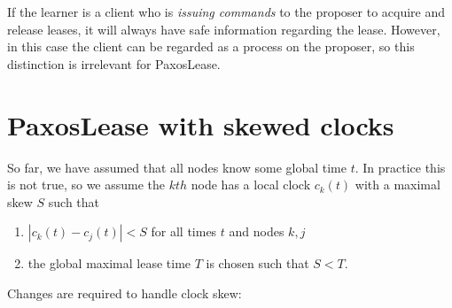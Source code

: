 \documentclass[12pt]{article}
\begin{document}
If the learner is a client who is \emph{issuing commands} to the proposer to acquire and release leases, it will always have safe information regarding the lease. However, in this case the client can be regarded as a process on the proposer, so this distinction is irrelevant for PaxosLease.

\section{ PaxosLease with skewed clocks }

So far, we have assumed that all nodes know some global time $t$. In practice this is not true, so we assume the $kth$ node has a local clock $c_k(t)$ with a maximal skew $S$ such that

\begin{enumerate}

\item $|c_k(t) - c_j(t)| < S$ for all times $t$ and nodes $k, j$

\item the global maximal lease time $T$ is chosen such that $S < T$.

\end{enumerate}

Changes are required to handle clock skew:
\end{document}
